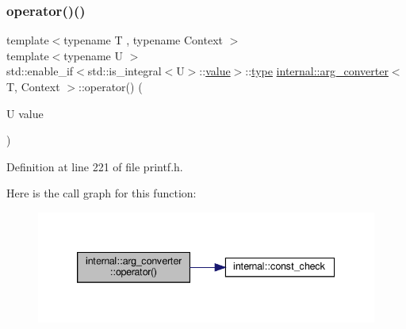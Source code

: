 \mbox{\label{classinternal_1_1arg__converter_a668fe71d2991260b6c7eac4a9e663a60}} 
\subsubsection{\texorpdfstring{operator()()}{operator()()}\hspace{0.1cm}{\footnotesize\ttfamily [2/3]}}
{\footnotesize\ttfamily template$<$typename T , typename Context $>$ \\
template$<$typename U $>$ \\
std\+::enable\+\_\+if$<$std\+::is\+\_\+integral$<$U$>$\+::\hyperlink{classinternal_1_1value}{value}$>$\+::\hyperlink{namespaceinternal_a8661864098ac0acff9a6dd7e66f59038}{type} \hyperlink{classinternal_1_1arg__converter}{internal\+::arg\+\_\+converter}$<$ T, Context $>$\+::operator() (\begin{DoxyParamCaption}\item[{U}]{value }\end{DoxyParamCaption})\hspace{0.3cm}{\ttfamily [inline]}}



Definition at line 221 of file printf.\+h.

Here is the call graph for this function\+:
\nopagebreak
\begin{figure}[H]
\begin{center}
\leavevmode
\includegraphics[width=339pt]{classinternal_1_1arg__converter_a668fe71d2991260b6c7eac4a9e663a60_cgraph}
\end{center}
\end{figure}
\mbox{\label{classinternal_1_1arg__converter_a9b2f70002d7b681658622f8551126399}} 
